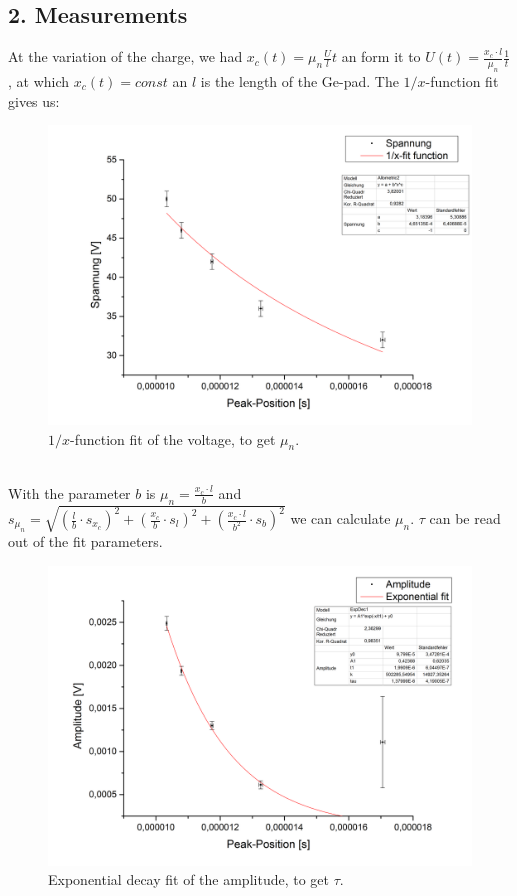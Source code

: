 \subsection*{2. Measurements}
At the variation of the charge, we had $\mathit{x_{c}(t)=\mu_{n}\frac{U}{l}t}$ an form it to $\mathit{U(t)=\frac{x_{c} \cdot l}{\mu_{n}}\frac{1}{t}}$, at which $\mathit{x_{c}(t)=const}$ an $\mathit{l}$ is the length of the Ge-pad. The $\mathit{1/x}$-function fit gives us:\\
\begin{figure}[h]
\begin{center}
\includegraphics[scale=0.5]{Bilder/t2_2_my}
\caption{$\mathit{1/x}$-function fit of the voltage, to get $\mathit{\mu_{n}}$. }
\label{fig:2my}
\end{center}
\end{figure}\\
With the parameter $\mathit{b}$ is $\mathit{\mu_{n}=\frac{x_{c} \cdot l}{b}}$ and $\mathit{s_{\mu_{n}}=\sqrt{(\frac{l}{b}\cdot s_{x_{c}})^2+(\frac{x_{c}}{b}\cdot s_{l})^2+(\frac{x_{c} \cdot l}{b^2}\cdot s_{b})^2}}$ we can calculate $\mathit{\mu_{n}}$.
\newpage
$\mathit{\tau}$ can be read out of the fit parameters.
\begin{figure}[h]
\begin{center}
\includegraphics[scale=0.5]{Bilder/t2_2_tau}
\caption{Exponential decay fit of the amplitude, to get $\mathit{\tau}$. }
\label{fig:2tau}
\end{center}
\end{figure}\\
